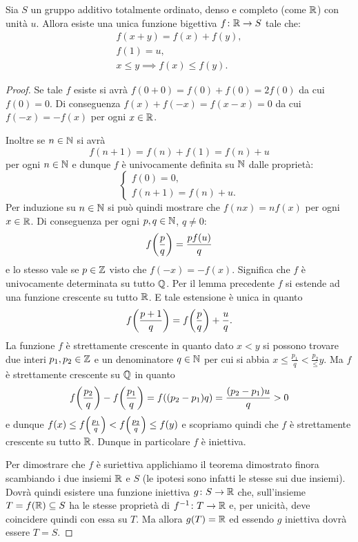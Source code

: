 \begin{theorem}[unicità di $\RR$]%
  \label{th:unicitaR}%
  Sia $S$ un gruppo additivo totalmente ordinato, denso e completo (come $\RR$)
  con unità $u$. Allora esiste una unica funzione bigettiva
  $f\colon \mathbb R\to S$ tale che:
  \begin{gather*}
    f(x+y) = f(x) + f(y),\\
    f(1) = u, \\
    x\le y \implies f(x) \le f(y).
  \end{gather*}
\end{theorem}
%
\begin{proof}
Se tale $f$ esiste si avrà $f(0+0)=f(0)+f(0) = 2f(0)$ da cui $f(0) = 0$.
Di conseguenza $f(x) + f(-x) = f(x-x) = 0$ da cui $f(-x) = -f(x)$
per ogni $x\in \mathbb R$.

Inoltre se $n\in \mathbb N$ si avrà
\[
  f(n+1) = f(n) + f(1) = f(n) + u  
\]
per ogni $n\in \mathbb N$ e dunque $f$ è univocamente definita su $\mathbb N$ 
dalle proprietà:
\[
\begin{cases}
  f(0) = 0, \\
  f(n+1) = f(n) + u.
\end{cases}  
\]
Per induzione su $n\in \mathbb N$ si può quindi mostrare che $f(nx) = nf(x)$ 
per ogni $x\in \mathbb R$. 
Di conseguenza per ogni $p,q\in \mathbb N$, $q\neq 0$:
\[
  f{\left( \frac p q \right)} = \frac{pf(u)}{q}
\]
e lo stesso vale se $p\in \mathbb Z$ visto che $f(-x) = -f(x)$.
Significa che $f$ è univocamente determinata su tutto $\mathbb Q$.
Per il lemma precedente $f$ si estende ad una funzione crescente 
su tutto $\RR$. E tale estensione è unica in quanto 
\[
  f{\left( \frac{p+1}{q} \right)} = f{\left( \frac p q \right)}+\frac{u}{q}.
\]
La funzione $f$ è strettamente crescente in quanto dato $x<y$ si possono trovare 
due interi $p_1,p_2\in \mathbb Z$ e un denominatore $q\in \mathbb N$ 
per cui si abbia $x\le \frac{p_1}{q} < \frac{p_2} \le y$.
Ma $f$ è strettamente crescente su $\mathbb Q$ in quanto
\[
  f{\left( \frac{p_2}q \right)} - f{\left( \frac{p_1}q \right)}
= f({\left( p_2-p_1 \right)}{q}) = \frac{(p_2-p_1)u}{q}>0
\]
e dunque $f(x)\le f{\left( \frac{p_1}q \right)} < f{\left( \frac{p_2}q \right)}\le f(y)$
e scopriamo quindi che $f$ è strettamente crescente su tutto $\RR$.
Dunque in particolare $f$ è iniettiva.

Per dimostrare che $f$ è suriettiva applichiamo il teorema dimostrato finora 
scambiando i due insiemi $\RR$ e $S$ (le ipotesi sono infatti le stesse sui due insiemi).
Dovrà quindi esistere una funzione iniettiva $g\colon S\to \mathbb R$ che, 
sull'insieme $T=f(\mathbb R)\subseteq S$ ha le stesse proprietà di $f^{-1}\colon T \to \mathbb R$
e, per unicità, deve coincidere quindi con essa su $T$. 
Ma allora $g(T)=\mathbb R$ ed essendo $g$ iniettiva dovrà essere $T=S$.
\end{proof}

